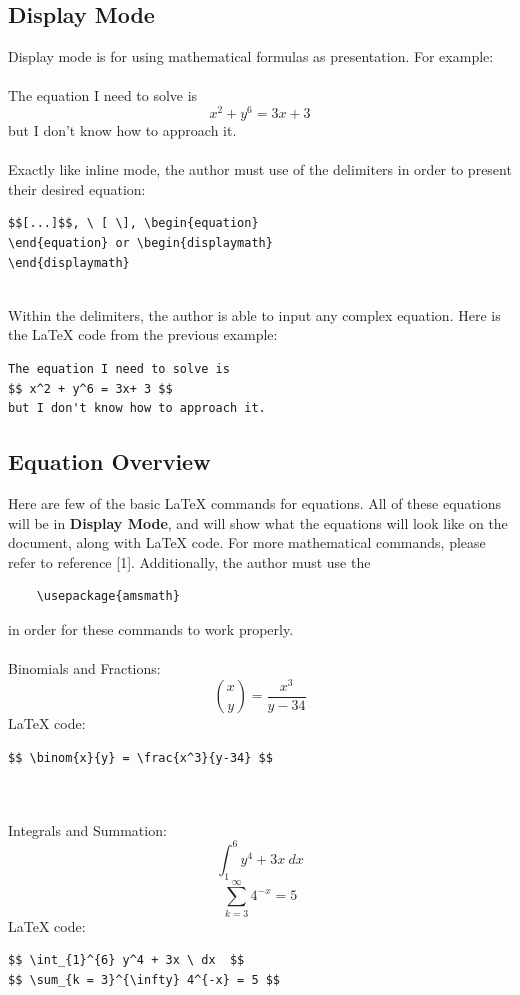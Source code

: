 \documentclass[11pt,twocolumn]{article}
\begin{document}
\subsection{Display Mode}
Display mode is for using mathematical formulas as presentation. For example:
\\ 
\\
The equation I need to solve is
$$ x^2 + y^6 = 3x+ 3 $$
but I don't know how to approach it.
\\
\\
Exactly like inline mode, the author must use of the delimiters in order to present their desired equation:
\begin{verbatim}
$$[...]$$, \ [ \], \begin{equation} 
\end{equation} or \begin{displaymath} 
\end{displaymath} 
\end{verbatim}
\\
Within the delimiters, the author is able to input any complex equation. Here is the {\LaTeX} code from the previous example:
\begin{verbatim}
The equation I need to solve is
$$ x^2 + y^6 = 3x+ 3 $$
but I don't know how to approach it.
\end{verbatim}

\subsection{Equation Overview}
Here are few of the basic {\LaTeX} commands for equations. All of these equations will be in {\bf {Display Mode}}, and will show what the equations will look like on the document, along with {\LaTeX} code. For more mathematical commands, please refer to reference [1]. Additionally, the author must use the
\begin{verbatim}
    \usepackage{amsmath}
\end{verbatim}
in order for these commands to work properly.
\\
\\
Binomials and Fractions:
$$ \binom{x}{y} = \frac{x^3}{y-34} $$
{\LaTeX} code:
\begin{verbatim}
$$ \binom{x}{y} = \frac{x^3}{y-34} $$
\end{verbatim}
\\
\\
Integrals and Summation:
$$ \int_{1}^{6} y^4 + 3x \ dx  $$
$$ \sum_{k = 3}^{\infty} 4^{-x} = 5 $$
{\LaTeX} code:
\begin{verbatim}
$$ \int_{1}^{6} y^4 + 3x \ dx  $$
$$ \sum_{k = 3}^{\infty} 4^{-x} = 5 $$
\end{verbatim}
\\
\\
\end{document}
